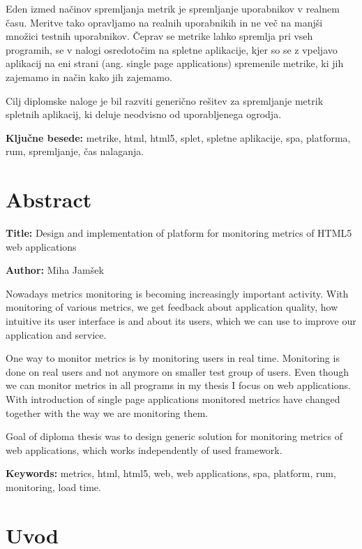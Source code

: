 \documentclass[a4paper, 12pt]{book}
\newcommand{\ttitleEn}{Design and implementation of platform for monitoring metrics of HTML5 web applications}
\newcommand{\tauthor}{Miha Jamšek}
\newcommand{\tkeywords}{metrike, html, html5, splet, spletne aplikacije, spa, platforma, rum, spremljanje, čas nalaganja}
\newcommand{\tkeywordsEn}{metrics, html, html5, web, web applications, spa, platform, rum, monitoring, load time}
\newcommand{\clearemptydoublepage}{\newpage{\pagestyle{empty}\cleardoublepage}}
\begin{document}
Eden izmed načinov spremljanja metrik je spremljanje uporabnikov v realnem času. Meritve tako opravljamo na realnih uporabnikih in ne več na manjši množici testnih uporabnikov. Čeprav se metrike lahko spremlja pri vseh programih, se v nalogi osredotočim na spletne aplikacije, kjer so se z  vpeljavo aplikacij na eni strani (ang. single page applications) spremenile metrike, ki jih zajemamo in način kako jih zajemamo.

Cilj diplomske naloge je bil razviti generično rešitev za spremljanje metrik spletnih aplikacij, ki deluje neodvisno od uporabljenega ogrodja.


\bigskip

\noindent\textbf{Ključne besede:} \tkeywords.
\clearemptydoublepage

\chapter*{Abstract}

\noindent\textbf{Title:} \ttitleEn
\bigskip

\noindent\textbf{Author:} \tauthor
\bigskip

\noindent
Nowadays metrics monitoring is becoming increasingly important activity. With monitoring of various metrics, we get feedback about application quality, how intuitive its user interface is and about its users, which we can use to improve our application and service.
 
One way to monitor metrics is by monitoring users in real time. Monitoring is done on real users and not anymore on smaller test group of users. Even though we can monitor metrics in all programs in my thesis I focus on web applications. With introduction of single page applications monitored metrics have changed together with the way we are monitoring them.

Goal of diploma thesis was to design generic solution for monitoring metrics of web applications, which works independently of used framework.


\bigskip

\noindent\textbf{Keywords:} \tkeywordsEn.
\clearemptydoublepage

\mainmatter
\setcounter{page}{1}
\pagestyle{fancy}

\chapter{Uvod}
\end{document}
